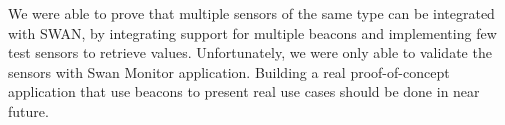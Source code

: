 We were able to prove that multiple sensors of the same type can be integrated with SWAN, by integrating support for multiple beacons and implementing few test sensors to retrieve values.
Unfortunately, we were only able to validate the sensors with Swan Monitor\cite{swan_monitor} application. Building a real proof-of-concept application that use beacons to present real use cases should be done in near future.

